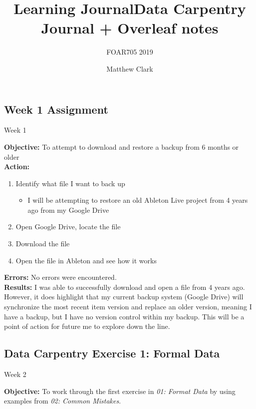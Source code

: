 \documentclass{article}
\title{Learning Journal}
\subtitle{FOAR705 2019}
\author{Matthew Clark}
\date{\vspace{-5ex}} %
\begin{document}
\maketitle
\newpage
\tableofcontents
\newpage
\title{Data Carpentry Journal + Overleaf notes}
\maketitle
\newpage
\begin{center}
\section{Week 1 Assignment}
Week 1
\end{center}
\noindent
\textbf{Objective:} To attempt to download and restore a backup from 6 months or older\\
\textbf{Action:}
\begin{enumerate}
    \item Identify what file I want to back up
    \begin{itemize}
        \item I will be attempting to restore an old Ableton Live project from 4 years ago from my Google Drive
    \end{itemize}
    \item Open Google Drive, locate the file
    \item Download the file
    \item Open the file in Ableton and see how it works
\end{enumerate}
\textbf{Errors:} No errors were encountered. \\
\textbf{Results:} I was able to successfully download and open a file from 4 years ago. However, it does highlight that my current backup system (Google Drive) will synchronize the most recent item version and replace an older version, meaning I have a backup, but I have no version control within my backup. This will be a point of action for future me to explore down the line.
\newpage
\begin{center}
\section{Data Carpentry Exercise 1: Formal Data}
Week 2
\end{center}
\noindent
\textbf{Objective:} To work through the first exercise in \textit{01: Format Data} by using examples from \textit{02: Common Mistakes}.
\end{document}
